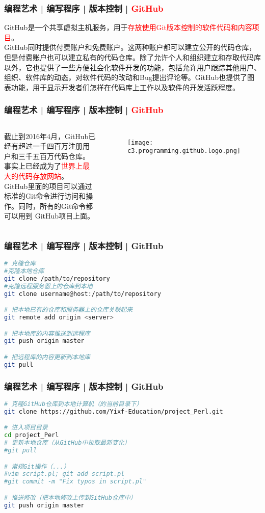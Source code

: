 \begin{frame}
  \frametitle{编程艺术 | 编写程序 | 版本控制 | \textcolor{red}{GitHub}}
  GitHub是一个共享虚拟主机服务，用于\textcolor{red}{存放使用Git版本控制的软件代码和内容项目}。\\
  \vspace{1em}
GitHub同时提供付费账户和免费账户。这两种账户都可以建立公开的代码仓库，但是付费账户也可以建立私有的代码仓库。除了允许个人和组织建立和存取代码库以外，它也提供了一些方便社会化软件开发的功能，包括允许用户跟踪其他用户、组织、软件库的动态，对软件代码的改动和Bug提出评论等。GitHub也提供了图表功能，用于显示开发者们怎样在代码库上工作以及软件的开发活跃程度。\\
\end{frame}

\begin{frame}
  \frametitle{编程艺术 | 编写程序 | 版本控制 | \textcolor{red}{GitHub}}
  \begin{columns}
截止到2016年4月，GitHub已经有超过一千四百万注册用户和三千五百万代码仓库。事实上已经成为了\textcolor{red}{世界上最大的代码存放网站}。\\
  \vspace{1em}
  GitHub里面的项目可以通过标准的Git命令进行访问和操作。同时，所有的Git命令都可以用到 GitHub项目上面。
    \begin{figure}
      \centering
      \texttt{[image: c3.programming.github.logo.png]}
    \end{figure}
\end{columns}
\end{frame}

\begin{frame}[fragile]
  \frametitle{编程艺术 | 编写程序 | 版本控制 | GitHub}
\begin{lstlisting}[language=sh]
# 克隆仓库
#克隆本地仓库
git clone /path/to/repository
#克隆远程服务器上的仓库到本地
git clone username@host:/path/to/repository

# 把本地已有的仓库和服务器上的仓库关联起来
git remote add origin <server>

# 把本地库的内容推送到远程库
git push origin master

# 把远程库的内容更新到本地库
git pull
\end{lstlisting}
\end{frame}

\begin{frame}[fragile]
  \frametitle{编程艺术 | 编写程序 | 版本控制 | GitHub}
\begin{lstlisting}[language=sh]
# 克隆GitHub仓库到本地计算机（的当前目录下）
git clone https://github.com/Yixf-Education/project_Perl.git

# 进入项目目录
cd project_Perl
# 更新本地仓库（从GitHub中拉取最新变化）
#git pull

# 常规Git操作（...）
#vim script.pl; git add script.pl
#git commit -m "Fix typos in script.pl" 

# 推送修改（把本地修改上传到GitHub仓库中）
git push origin master
\end{lstlisting}
\end{frame}

